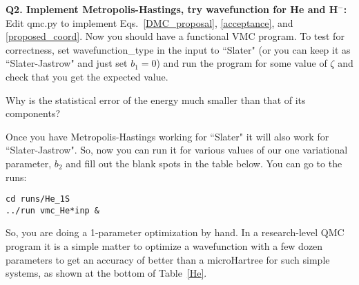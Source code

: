 \documentclass[11pt,aps,prb,amsmath,amssymb,superscriptaddress,notitlepage]{revtex4-1}
\begin{document}
{\color{blue}
\textbf{Q2. Implement Metropolis-Hastings, try wavefunction for He and H$^-$:}\\ 
Edit qmc.py to implement Eqs.~\ref{DMC_proposal}, \ref{acceptance}, and \ref{proposed_coord}.
Now you should have a functional VMC program.  To test for correctness, set wavefunction\_type in
the input to ``Slater" (or you can keep it as ``Slater-Jastrow" and just set $b_1=0$) and run
the program for some value of $\zeta$ and check that you get the expected value.

Why is the statistical error of the energy much smaller than that of its components?

\vskip 3mm
Once you have Metropolis-Hastings working for ``Slater" it will also work for ``Slater-Jastrow".
So, now you can run it for various values of our one variational parameter, $b_2$ and fill out
the blank spots in the table below.
You can go to the runs:
\begin{verbatim}
cd runs/He_1S
../run vmc_He*inp &
\end{verbatim}
So, you are doing a 1-parameter optimization by hand.  In a research-level QMC program it is a simple
matter to optimize a wavefunction with a few dozen parameters to get an accuracy of better than
a microHartree for such simple systems, as shown at the bottom of Table~\ref{He}.

}
\end{document}
